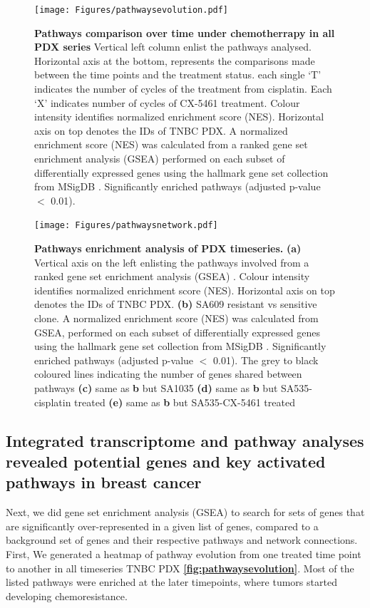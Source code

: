  \begin{figure}
\centering
\texttt{[image: Figures/pathwaysevolution.pdf]}
\caption[Summary of number of genes \textit{in-cis} and \textit{in-trans}]
	{\small
	\textbf{Pathways comparison over time under chemotherrapy in all PDX series}
	Vertical left column enlist the pathways analysed. Horizontal axis at the bottom, represents the comparisons made between the time points and the treatment status. each single `T' indicates the number of cycles of the treatment from cisplatin. Each `X' indicates number of cycles of CX-5461 treatment. Colour intensity identifies normalized enrichment score (NES). Horizontal axis on top denotes the IDs of TNBC PDX. A normalized enrichment score (NES) was calculated from a ranked gene set enrichment analysis (GSEA) \cite{shi2007gene} performed on each subset of differentially expressed genes using the hallmark gene set collection from MSigDB \cite{liberzon2015molecular}.  Significantly enriched pathways (adjusted p-value $<$ 0.01).
}
    \label{fig:pathwaysevolution}
    \end{figure}
\begin{figure}
\centering
  \texttt{[image: Figures/pathwaysnetwork.pdf]}
\caption[Pathways enrichment analysis of PDX timeseries]
	{\small
	\textbf{Pathways enrichment analysis of PDX timeseries.}
	 	\textbf{(a)} Vertical axis on the left enlisting the pathways involved from a ranked gene set enrichment analysis (GSEA) \cite{shi2007gene}. Colour intensity identifies normalized enrichment score (NES). Horizontal axis on top denotes the IDs of TNBC PDX. \textbf{(b)} SA609 resistant vs sensitive clone.  A normalized enrichment score (NES) was calculated from GSEA, performed on each subset of differentially expressed genes using the hallmark gene set collection from MSigDB \cite{liberzon2015molecular}. Significantly enriched pathways (adjusted p-value $<$ 0.01). The grey to black coloured lines indicating the number of genes shared between pathways \textbf{(c)} same as \textbf{b} but SA1035 \textbf{(d)} same as \textbf{b} but SA535-cisplatin treated \textbf{(e)} same as \textbf{b} but SA535-CX-5461 treated
	}
	\label{fig:pathwaysnetwork}
\end{figure}

\subsection{Integrated transcriptome and pathway analyses revealed potential genes and key activated pathways in breast cancer}
Next, we did gene set enrichment analysis (GSEA) to search for sets of genes that are significantly over-represented in a given list of genes, compared to a background set of genes and their respective pathways and network connections. First, We generated a heatmap of pathway evolution from one treated time point to another in all timeseries TNBC PDX \textbf{\autoref{fig:pathwaysevolution}}. Most of the listed pathways were enriched at the later timepoints, where tumors started developing chemoresistance. 

